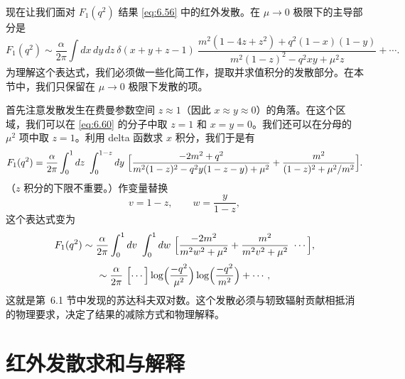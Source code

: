 现在让我们面对 $F_1(q^2)$ 结果 \eqref{eq:6.56} 中的红外发散。在 $\mu\to 0$ 极限下的主导部分是
\begin{equation}
  F_1(q^2) \sim \frac{\alpha}{2\pi}\int dx\,dy\,dz\ \delta(x+y+z-1)\
    \frac{m^2(1-4z+z^2) + q^2(1-x)(1-y)}
      {m^2(1-z)^2 - q^2xy + \mu^2z}
    + \cdots .
  \label{eq:6.60}
\end{equation}
为理解这个表达式，我们必须做一些化简工作，提取并求值积分的发散部分。在本节中，我们只保留在 $\mu\to 0$ 极限下发散的项。

首先注意发散发生在费曼参数空间 $z\approx 1$（因此 $x\approx y\approx 0$）的角落。在这个区域，我们可以在 \eqref{eq:6.60} 的分子中取 $z = 1$ 和 $x = y = 0$。我们还可以在分母的 $\mu^2$ 项中取 $z = 1$。利用 delta 函数求 $x$ 积分，我们于是有
\begin{equation}
  F_1(q^2) = \frac{\alpha}{2\pi}\int_0^1 dz\ \int_0^{1-z} dy\
    \Bigl[ \frac{-2m^2 + q^2}{m^2(1-z)^2 - q^2y(1-z-y) + \mu^2}
      + \frac{m^2}{(1-z)^2 + \mu^2/m^2} \Bigr].
\end{equation}
（$z$ 积分的下限不重要。）作变量替换
\begin{equation}
  v = 1 - z,\qquad w = \frac{y}{1-z},
\end{equation}
这个表达式变为
\begin{equation}
  F_1(q^2) \sim \frac{\alpha}{2\pi}\int_0^1 dv\
    \int_0^1 dw\ \Bigl[ \frac{-2m^2}{m^2w^2 + \mu^2}
      + \frac{m^2}{m^2v^2 + \mu^2}\ \cdots \Bigr],
\end{equation}
\begin{equation}
  \sim \frac{\alpha}{2\pi}\ \Bigl[ \cdots \Bigr]
    \log\Bigl( \frac{-q^2}{\mu^2} \Bigr)\log\Bigl( \frac{-q^2}{m^2}
      \Bigr) + \cdots ,
  \label{eq:6.61}
\end{equation}
这就是第~6.1 节中发现的苏达科夫双对数。这个发散必须与轫致辐射贡献相抵消的物理要求，决定了结果的减除方式和物理解释。

\section{红外发散求和与解释}


